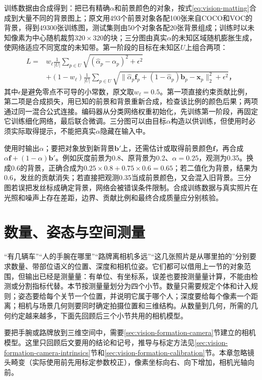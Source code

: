 训练数据由合成得到：把已有精确$\alpha$和前景颜色的对象，按式\eqref{eq:vision-matting}合成到大量不同的背景图上；原文用493个前景对象各配100张来自COCO和VOC的背景，得到49300张训练图，测试集则由50个对象各配20张背景组成；训练时以未知像素为中心随机裁剪$320\times320$的块；三分图由真实$\alpha$的未知区域随机膨胀生成，使网络适应不同宽度的未知带。第一阶段的目标在未知区$U$上组合两项：
\[
 \begin{aligned}
 L={}&w_\ell\frac1{|U|}\sum_{p\in U}\sqrt{(\hat\alpha_p-\alpha_p)^2+\epsilon^2}\\
 &+(1-w_\ell)\frac1{|U|}\sum_{p\in U}
 \sqrt{\lVert\hat\alpha_p\bm f_p+(1-\hat\alpha_p)\bm b_p-\bm x_p\rVert_2^2+\epsilon^2}\text{，}
 \end{aligned}
\]
其中$\epsilon$是避免零点不可导的小常数，原文取$w_\ell=0.5$。第一项直接约束贡献比例，第二项是合成损失，用已知的前景和背景重新合成，检查该比例的颜色后果；两项通过同一混合公式连接。编码器从分类网络权重初始化，先训练第一阶段，再固定它训练细化网络，最后联合微调。三分图可以由目标$\alpha$构造以供训练，但使用时必须实际取得提示，不能把真实$\alpha$隐藏在输入中。

使用时输出$\alpha$；要把对象放到新背景$\bm{b}'$上，还需估计或取得前景颜色$\bm{f}$，再合成$\alpha\bm{f}+(1-\alpha)\bm{b}'$。例如灰度前景为0.8、原背景为0.2、$\alpha=0.25$，观测为0.35。换成0.6的背景，正确合成为$0.25\times0.8+0.75\times0.6=0.65$；若二值化为背景，结果为0.6，发丝的贡献消失；若直接把观测0.35当成前景颜色，又会混入旧背景。三分图若误把发丝标成确定背景，网络会被错误条件限制。合成训练数据与真实照片在光照和噪声上存在差距，边界、贡献比例和最终合成质量应分别核验。

\section{数量、姿态与空间测量}
\label{sec:vision-recognition-measurement}

“有几辆车”“人的手腕在哪里”“路牌离相机多远”“这几张照片是从哪里拍的”分别要求数量、带部位语义的位置、深度和相机位姿。它们都可以借用上一节的对象范围，但输出已经是测量量：有单位、有坐标系，误差也要按测量量计算，不能由检测或分割指标代替。本节按测量量划分为四个小节。数量只需要规定个体和计入规则；姿态要给每个关节一个位置，并说明它属于哪个人；深度要给每个像素一个距离；相机与场景几何则要同时确定拍摄位置和三维结构。从数量到几何，所需的几何约定越来越多，下面先回顾后三个小节共用的相机模型。

要把手腕或路牌放到三维空间中，需要\ref{sec:vision-formation-camera}节建立的相机模型。这里只回顾后文要用的结论和记号，推导与标定方法见\ref{sec:vision-formation-camera-intrinsics}节和\ref{sec:vision-formation-calibration}节。本章忽略镜头畸变（实际使用前先用标定参数校正），像素坐标向右、向下增加，相机光轴向前。

